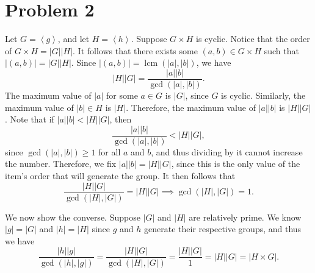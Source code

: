 \documentclass[11pt, letterpaper]{report}
\begin{document}
\section*{Problem 2}
\begin{solution}
	Let $G=\left<g \right>$, and let $H=\left<h \right>$. Suppose $G\times H$ is cyclic. Notice that the order of $G\times H=\left| G \right| \left| H \right| $. It follows that there exists some $(a,b)\in G\times H$ such that $\left| \left( a,b \right)  \right| =\left| G \right| \left| H \right| $. Since $\left| (a,b) \right| =\operatorname{lcm}(\left| a \right| ,\left| b \right| ) $, we have
	\[
		\left| H \right| \left| G \right| =\frac{\left| a \right| \left| b \right| }{\operatorname{gcd}(\left| a \right| ,\left| b \right| ) }
	.\]
	The maximum value of $\left| a \right| $ for some $a\in G$ is $\left| G \right| $, since $G$ is cyclic. Similarly, the maximum value of $\left| b \right| \in H$ is $\left| H \right| $. Therefore, the maximum value of $\left| a \right| \left| b \right| $ is $\left| H \right| \left| G \right| $. Note that if $\left| a \right| \left| b \right| <\left| H \right| \left| G \right| $, then
	\[
		\frac{\left| a \right| \left| b \right| }{\operatorname{gcd}(\left| a \right| ,\left| b \right| ) }<\left| H \right| \left| G \right| 
	,\]
	since $\operatorname{gcd}(\left| a \right| ,\left| b \right| ) \geq 1$ for all $a$ and $b$, and thus dividing by it cannot increase the number. Therefore, we fix $\left| a \right| \left| b \right| = \left| H \right| \left| G \right| $, since this is the only value of the item's order that will generate the group. It then follows that
	\[
		\frac{\left| H \right| \left| G \right| }{\operatorname{gcd}(\left| H \right|, \left| G \right| ) }=\left| H \right| \left| G \right| \implies \operatorname{gcd}(\left| H \right| ,\left| G \right| ) =1
	.\]

	We now show the converse. Suppose $\left| G \right| $ and $\left| H \right| $ are relatively prime. We know $\left| g \right| =\left| G \right| $ and $\left| h \right| =\left| H \right| $ since $g$ and $h$ generate their respective groups, and thus we have
	\[
		\frac{\left| h \right| \left| g \right| }{\operatorname{gcd}(\left| h \right| ,\left| g \right| ) }=\frac{\left| H \right| \left| G \right| }{\operatorname{gcd}(\left| H \right| ,\left| G \right| ) }=\frac{\left| H \right| \left| G \right| }{1}=\left| H \right| \left| G \right| =\left| H\times G \right| 
	.\]
\end{solution}
\end{document}
